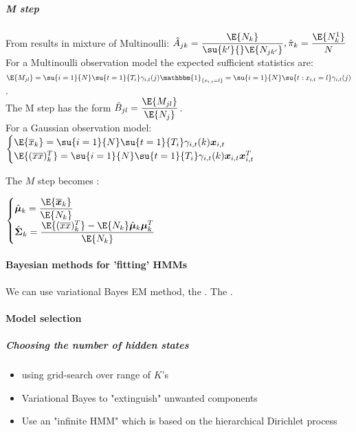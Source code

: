 \subparagraph{M step}
From results in mixture of Multinoulli:
$\hat{A}_{jk} = \dfrac{\E{N_{k}}}{\su{k'}{}\E{N_{jk'}}}, \hat{\pi}_{k}=\dfrac{\E{N^{1}_{k}}}{N}$\\
For a Multinoulli observation model the expected sufficient statistics are:
$\E{M_{jl}} = \su{i=1}{N}\su{t=1}{T_{i}}\gamma_{i,t}(j)\mathbbm{1}_{\{x_{i,t}=l\}} = 
\su{i=1}{N}\su{t:x_{i,t}=l}\gamma_{i,t}(j)$.\\
The M step has the form $\hat{B}_{jl} = \dfrac{\E{M_{jl}}}{\E{N_{j}}}$.\\
For a Gaussian observation model:
$\begin{cases}
    \E{\overline{x}_{k}} = \su{i=1}{N}\su{t=1}{T_{i}}\gamma_{i,t}(k)\bm{x}_{i,t} \\
    \E{(\overline{x}\overline{x})^{T}_{k}} = \su{i=1}{N}\su{t=1}{T_{i}}\gamma_{i,t}(k)\bm{x}_{i,t}
    \bm{x}^{T}_{i,t}
\end{cases}$

The $M$ step becomes :

$\begin{cases}
    \hat{\bm{\mu}}_{k} = \dfrac{\E{\overline{\bm{x}}_{k}}}{\E{N_{k}}} \\
    \hat{\bm{\Sigma}}_{k} = \dfrac{\E{(\overline{x}\overline{x})^{T}_{k}} - \E{N_{k}}\hat{\bm{\mu}}_
    {k} \bm{{\mu}}^{T}_{k}}{\E{N_{k}}}
\end{cases}$

\paragraph{Bayesian methods for 'fitting' HMMs}
We can use variational Bayes EM method, the . The .

\paragraph{Model selection}
\subparagraph{Choosing the number of hidden states}
\begin{itemize}
    \item using grid-search over range of $K$'s 
    \item Variational Bayes to "extinguish" unwanted components
    \item Use an "infinite HMM" which is based on the hierarchical Dirichlet process
\end{itemize}

